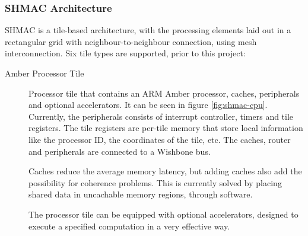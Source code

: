 \subsubsection{SHMAC Architecture}

SHMAC is a tile-based architecture, with the processing elements laid out in a rectangular grid with neighbour-to-neighbour connection, using mesh interconnection.
Six tile types are supported, prior to this project\cite{shmac-plan}:

\begin{description}
  \item[Amber Processor Tile] Processor tile that contains an ARM Amber processor, caches, peripherals and optional accelerators.
  It can be seen in figure \ref{fig:shmac-cpu}.
  Currently, the peripherals consists of interrupt controller, timers and tile registers.
  The tile registers are per-tile memory that store local information like the processor ID, the coordinates of the tile, etc. 
  The caches, router and peripherals are connected to a Wishbone bus.
  
  Caches reduce the average memory latency, but adding caches also add the possibility for coherence problems.
  This is currently solved by placing shared data in uncachable memory regions, through software. 
  
  The processor tile can be equipped with optional accelerators, designed to execute a specified computation in a very effective way.
  

\end{description}

